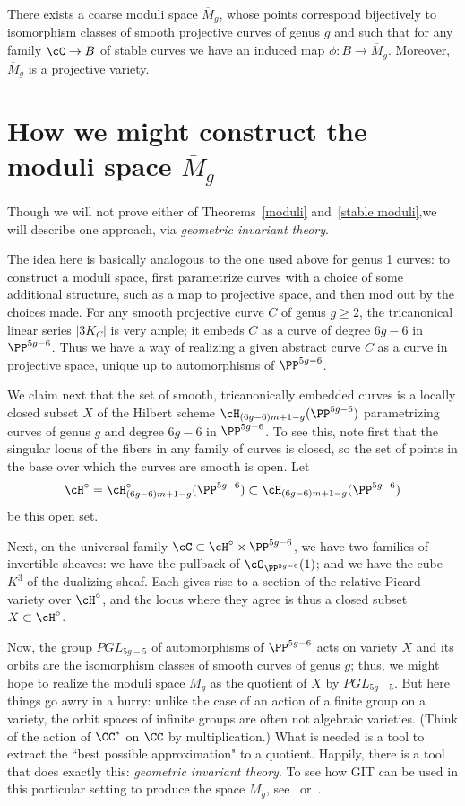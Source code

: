 

\begin{theorem}\label{stable moduli}
There exists a coarse moduli space $\overline M_g$, whose points correspond bijectively to isomorphism classes of smooth projective curves of genus $g$ and such that for any family $\cC \to B$ of stable curves we have an induced map $\phi : B \to \overline M_g$. Moreover, $\overline M_g$ is a projective variety.
\end{theorem}

\section{How we might construct the moduli space $\overline M_g$}

Though we will not prove either of Theorems~\ref{moduli} and~\ref{stable moduli},we will describe one approach, via \emph{geometric invariant theory}.

The  idea here is basically analogous to the one used above for genus 1 curves: to construct a moduli space, first parametrize curves with a choice of some additional structure, such as a map to projective space, and then mod out by the choices made. For any smooth projective curve $C$ of genus $g\geq 2$, the tricanonical linear series $|3K_C|$ is very ample; it embeds $C$ as a curve of degree $6g-6$ in $\PP^{5g-6}$. Thus we have a way of realizing a given abstract curve $C$ as a curve in projective space, unique up to automorphisms of $\PP^{5g-6}$.

We claim next that the set of smooth, tricanonically embedded curves is a locally closed subset $X$ of the Hilbert scheme $\cH_{(6g-6)m+1-g}(\PP^{5g-6})$ parametrizing curves of genus $g$ and degree $6g-6$ in $\PP^{5g-6}$. To see this, note first that the singular locus of the fibers in any family of curves is closed, so the set of points in the base over which the curves are smooth is open.  Let 
$$
\cH^\circ = \cH^\circ_{(6g-6)m+1-g}(\PP^{5g-6})\subset \cH_{(6g-6)m+1-g}(\PP^{5g-6})
$$
be this open set.

Next, on the universal family $\cC \subset \cH^\circ \times \PP^{5g-6}$, we have two families of invertible sheaves: we have the pullback of $\cO_{\PP^{5g-6}}(1)$; and we have the cube $K^3$ of the dualizing sheaf. Each gives rise to a section of the relative Picard variety over $\cH^\circ$, and the locus where they agree is thus a closed subset $X \subset \cH^\circ$.

Now, the group $PGL_{5g-5}$ of automorphisms of $\PP^{5g-6}$ acts on variety $X$ and its orbits
are the isomorphism classes of smooth curves of genus $g$; thus, we might hope to realize the moduli space $M_g$ as the quotient of $X$ by $PGL_{5g-5}$. But here things go awry in a hurry: unlike the case of an action of a finite group on a variety,
the orbit spaces of infinite groups are often not algebraic varieties. (Think of the action of $\CC^*$ on $\CC$ by multiplication.) What is needed is a tool to extract the ``best possible approximation" to a quotient. Happily, there is a tool that does exactly this:  \emph{geometric invariant theory}.  To see how GIT can be used in this particular setting to produce the space $M_g$, see~\cite{Mumford-Morrison} or~\cite{Harris-Morrison}.

